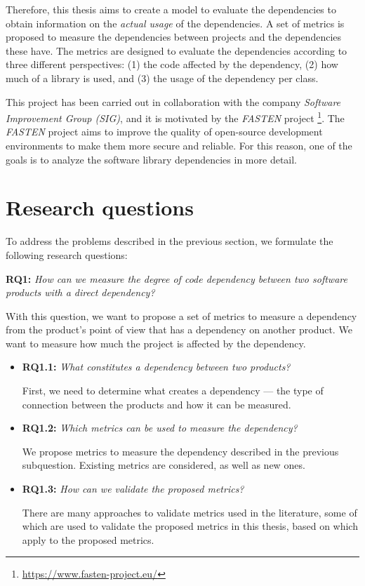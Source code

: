 \blankl
Therefore, this thesis aims to create a model to evaluate the dependencies to obtain information on the \textit{actual usage} of the dependencies. A set of metrics is proposed to measure the dependencies between projects and the dependencies these have. The metrics are designed to evaluate the dependencies according to three different perspectives: (1) the code affected by the dependency, (2) how much of a library is used, and (3) the usage of the dependency per class.

This project has been carried out in collaboration with the company \textit{Software Improvement Group (SIG)}, and it is motivated by the \textit{FASTEN} project \footnote{\url{https://www.fasten-project.eu/}}. The \textit{FASTEN} project aims to improve the quality of open-source development environments to make them more secure and reliable. For this reason, one of the goals is to analyze the software library dependencies in more detail.

\section{Research questions}
To address the problems described in the previous section, we formulate the following research questions:

\blankl
\textbf{RQ1:} \textit{How can we measure the degree of code dependency between two software products with a direct dependency?}

\blankls
With this question, we want to propose a set of metrics to measure a dependency from the product's point of view that has a dependency on another product. We want to measure how much the project is affected by the dependency.

\begin{itemize}
  \item \textbf{RQ1.1:} \textit{What constitutes a dependency between two products?}

  First, we need to determine what creates a dependency — the type of connection between the products and how it can be measured.

  \item \textbf{RQ1.2:} \textit{Which metrics can be used to measure the dependency?}

  We propose metrics to measure the dependency described in the previous subquestion. Existing metrics are considered, as well as new ones.

  \item \textbf{RQ1.3:} \textit{How can we validate the proposed metrics?}

  There are many approaches to validate metrics used in the literature, some of which are used to validate the proposed metrics in this thesis, based on which apply to the proposed metrics.
\end{itemize}

